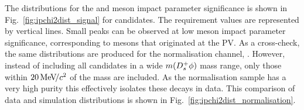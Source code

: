 The distributions for the \Bp and \Dsp meson impact parameter significance is shown in Fig.~\ref{fig:ipchi2dist_signal} for \decay{\Bp}{\Dsp\phiz} candidates. The requirement values are represented by vertical lines. Small peaks can be observed at low \Dsp meson impact parameter significance, corresponding to \Dsp mesons that originated at the PV. 
As a cross-check, the same distributions are produced for the normalisation channel, \decay{\Bp}{\Dsp\Dzb}. However, instead of including all candidates in a wide $m({{D}^+_{s}}\phi)$ mass range, only those within $20{\mathrm{\,Me\kern -0.1em V\!/}c^2}$ of the \Bp mass are included. As the normalisation sample has a very high purity this effectively isolates these decays in data. This comparison of data and simulation distributions is shown in Fig.~\ref{fig:ipchi2dist_normalisation}.

